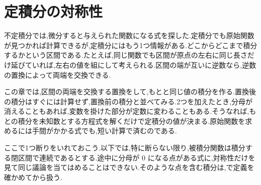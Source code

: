 \chapter{定積分の対称性}\label{章:定積分の対称性}

不定積分では,微分すると与えられた関数になる式を探した.定積分でも原始関数が見つかれば計算できるが,定積分にはもう1つ情報がある.どこからどこまで積分するかという区間である.たとえば,同じ関数でも区間が原点の左右に同じ長さだけ延びていれば,左右の値を組にして考えられる.区間の端が互いに逆数なら,逆数の置換によって両端を交換できる.

この章では,区間の両端を交換する置換をして,もとと同じ値の積分を作る.置換後の積分はすぐには計算せず,置換前の積分と並べてみる.2つを加えたとき,分母が消えることもあれば,変数を掛けた部分が定数に変わることもある.そうなれば,もとの積分を未知数とする方程式を解くだけで定積分の値が決まる.原始関数を求めるには手間がかかる式でも,短い計算で済むのである.

ここで1つ断りをいれておこう.以下では,特に断らない限り,被積分関数は積分する閉区間で連続であるとする.途中に分母が $0$ になる点がある式に,対称性だけを見て同じ議論を当てはめることはできない.そのような点を含む積分は,で定義を確かめてから扱う.

%
%
%
%
%
%
%
%

